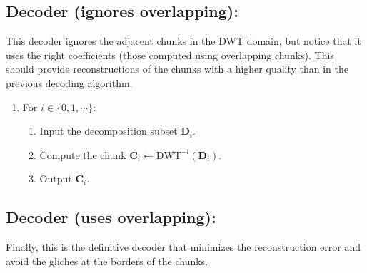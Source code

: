 
\subsection*{Decoder (ignores overlapping):}
This decoder ignores the adjacent chunks in the DWT domain, but notice that it uses the right coefficients (those computed using overlapping chunks). This should provide reconstructions of the chunks with a higher quality than in the previous decoding algorithm.
\begin{enumerate}
\item For $i\in\{0,1,\cdots\}$:
  \begin{enumerate}
  \item Input the decomposition subset ${\mathbf D}_i$.
  \item Compute the chunk ${\mathbf C}_i\leftarrow\text{DWT}^{-l}({\mathbf D}_i)$.
  \item Output ${\mathbf C}_i$.
  \end{enumerate}
\end{enumerate}

\subsection*{Decoder (uses overlapping):}

Finally, this is the definitive decoder that minimizes the
reconstruction error and avoid the gliches at the borders of the
chunks.

